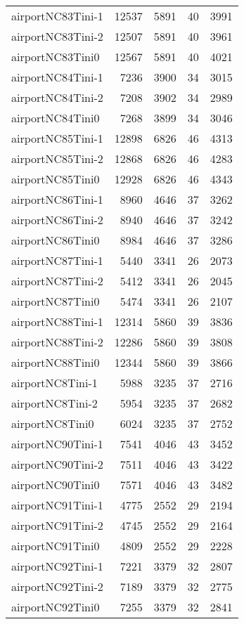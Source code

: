 \begin{longtable}{lrrrr}
airportNC83Tini-1 & 12537 & 5891 & 40 & 3991 \\
airportNC83Tini-2 & 12507 & 5891 & 40 & 3961 \\
airportNC83Tini0 & 12567 & 5891 & 40 & 4021 \\
airportNC84Tini-1 & 7236 & 3900 & 34 & 3015 \\
airportNC84Tini-2 & 7208 & 3902 & 34 & 2989 \\
airportNC84Tini0 & 7268 & 3899 & 34 & 3046 \\
airportNC85Tini-1 & 12898 & 6826 & 46 & 4313 \\
airportNC85Tini-2 & 12868 & 6826 & 46 & 4283 \\
airportNC85Tini0 & 12928 & 6826 & 46 & 4343 \\
airportNC86Tini-1 & 8960 & 4646 & 37 & 3262 \\
airportNC86Tini-2 & 8940 & 4646 & 37 & 3242 \\
airportNC86Tini0 & 8984 & 4646 & 37 & 3286 \\
airportNC87Tini-1 & 5440 & 3341 & 26 & 2073 \\
airportNC87Tini-2 & 5412 & 3341 & 26 & 2045 \\
airportNC87Tini0 & 5474 & 3341 & 26 & 2107 \\
airportNC88Tini-1 & 12314 & 5860 & 39 & 3836 \\
airportNC88Tini-2 & 12286 & 5860 & 39 & 3808 \\
airportNC88Tini0 & 12344 & 5860 & 39 & 3866 \\
airportNC8Tini-1 & 5988 & 3235 & 37 & 2716 \\
airportNC8Tini-2 & 5954 & 3235 & 37 & 2682 \\
airportNC8Tini0 & 6024 & 3235 & 37 & 2752 \\
airportNC90Tini-1 & 7541 & 4046 & 43 & 3452 \\
airportNC90Tini-2 & 7511 & 4046 & 43 & 3422 \\
airportNC90Tini0 & 7571 & 4046 & 43 & 3482 \\
airportNC91Tini-1 & 4775 & 2552 & 29 & 2194 \\
airportNC91Tini-2 & 4745 & 2552 & 29 & 2164 \\
airportNC91Tini0 & 4809 & 2552 & 29 & 2228 \\
airportNC92Tini-1 & 7221 & 3379 & 32 & 2807 \\
airportNC92Tini-2 & 7189 & 3379 & 32 & 2775 \\
airportNC92Tini0 & 7255 & 3379 & 32 & 2841 \\

\end{longtable}
